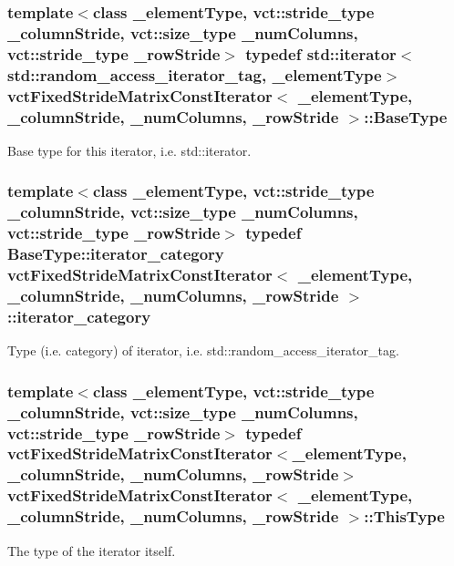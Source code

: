 \subsubsection[{Base\+Type}]{\setlength{\rightskip}{0pt plus 5cm}template$<$class \+\_\+element\+Type, vct\+::stride\+\_\+type \+\_\+column\+Stride, vct\+::size\+\_\+type \+\_\+num\+Columns, vct\+::stride\+\_\+type \+\_\+row\+Stride$>$ typedef std\+::iterator$<$std\+::random\+\_\+access\+\_\+iterator\+\_\+tag, \+\_\+element\+Type$>$ {\bf vct\+Fixed\+Stride\+Matrix\+Const\+Iterator}$<$ \+\_\+element\+Type, \+\_\+column\+Stride, \+\_\+num\+Columns, \+\_\+row\+Stride $>$\+::{\bf Base\+Type}}\label{classvct_fixed_stride_matrix_const_iterator_a305e6edbe5e4e2560f9bf01d3079a118}
Base type for this iterator, i.\+e. std\+::iterator. \hypertarget{classvct_fixed_stride_matrix_const_iterator_a31bfb3c59476ee6060ec1d08874c0419}{}
\subsubsection[{iterator\+\_\+category}]{\setlength{\rightskip}{0pt plus 5cm}template$<$class \+\_\+element\+Type, vct\+::stride\+\_\+type \+\_\+column\+Stride, vct\+::size\+\_\+type \+\_\+num\+Columns, vct\+::stride\+\_\+type \+\_\+row\+Stride$>$ typedef Base\+Type\+::iterator\+\_\+category {\bf vct\+Fixed\+Stride\+Matrix\+Const\+Iterator}$<$ \+\_\+element\+Type, \+\_\+column\+Stride, \+\_\+num\+Columns, \+\_\+row\+Stride $>$\+::{\bf iterator\+\_\+category}}\label{classvct_fixed_stride_matrix_const_iterator_a31bfb3c59476ee6060ec1d08874c0419}
Type (i.\+e. category) of iterator, i.\+e. std\+::random\+\_\+access\+\_\+iterator\+\_\+tag. \hypertarget{classvct_fixed_stride_matrix_const_iterator_a8c6ee7d655fb71d647506c3964a18e2c}{}
\subsubsection[{This\+Type}]{\setlength{\rightskip}{0pt plus 5cm}template$<$class \+\_\+element\+Type, vct\+::stride\+\_\+type \+\_\+column\+Stride, vct\+::size\+\_\+type \+\_\+num\+Columns, vct\+::stride\+\_\+type \+\_\+row\+Stride$>$ typedef {\bf vct\+Fixed\+Stride\+Matrix\+Const\+Iterator}$<$\+\_\+element\+Type, \+\_\+column\+Stride, \+\_\+num\+Columns, \+\_\+row\+Stride$>$ {\bf vct\+Fixed\+Stride\+Matrix\+Const\+Iterator}$<$ \+\_\+element\+Type, \+\_\+column\+Stride, \+\_\+num\+Columns, \+\_\+row\+Stride $>$\+::{\bf This\+Type}}\label{classvct_fixed_stride_matrix_const_iterator_a8c6ee7d655fb71d647506c3964a18e2c}
The type of the iterator itself. 

